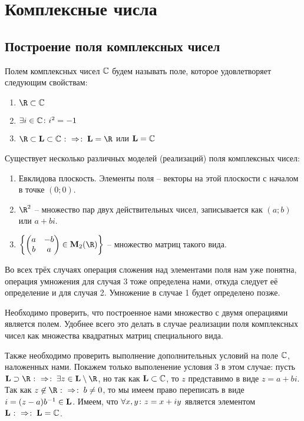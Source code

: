\newpage
\section{Комплексные числа}
\label{complex}
%

\subsection{Построение поля комплексных чисел}

Полем комплексных чисел $\mathbb{C}$ будем называть поле, которое удовлетворяет следующим свойствам:
\begin{enumerate}
  \item $\R\subset\Cbb$
  \item $\exists i\in\mathbb{C}\colon i^2=-1$
  \item $\R\subset\Lb\subset\Cbb\ra\Lb=\R$ или $\mathbf{L}=\mathbb{C}$
\end{enumerate}

Существует несколько различных моделей (реализаций) поля комплексных чисел:
\begin{enumerate}
  \item Евклидова плоскость. Элементы поля -- векторы на этой плоскости с началом в точке $(0;0)$.
  \item $\R^2$ -- множество пар двух действительных чисел, записывается как $(a;b)$ или $a+bi$.
  \item $\left\{\left(\begin{matrix}a&-b\\ b&a\end{matrix}\right)\in\Mb_2(\R) \right\}$ -- множество матриц такого вида.
\end{enumerate}

Во всех трёх случаях операция сложения над элементами поля нам уже понятна, операция умножения для случая 3 тоже определена нами, откуда следует её определение и для случая 2. Умножение в случае 1 будет определено позже.

Необходимо проверить, что построенное нами множество с двумя операциями является полем. Удобнее всего это делать в случае реализации поля комплексных чисел как множества квадратных матриц специального вида.

Также необходимо проверить выполнение дополнительных условий на поле $\mathbb{C}$, наложенных нами. Покажем только выполенение условия 3 в этом случае: пусть $\Lb\supset\R\ra \exists z\in\Lb\setminus\R$, но так как $\mathbf{L}\subset\mathbb{C}$, то $z$ представимо в виде $z=a+bi$. Так как $z\not\in\R\ra b\ne0$, то мы имеем право переписать в виде $i=(z-a)b^{-1}\in\mathbf{L}$. Имеем, что $\forall x,y\colon z=x+iy$ является элементом $\mathbf{L}\mathbin{\colon\Rightarrow \colon}\mathbf{L}=\mathbb{C}$.

